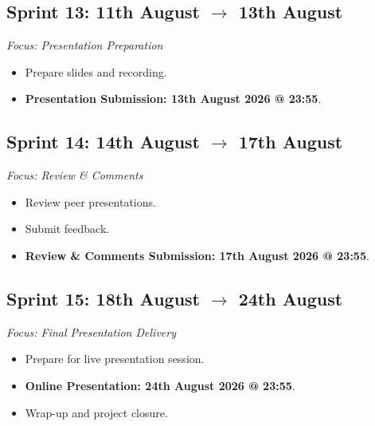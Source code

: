 \documentclass[12pt, a4paper, twoside]{article} %
\begin{document}

\subsection{Sprint 13: 11th August $\rightarrow$ 13th August}
\emph{Focus: Presentation Preparation}

\begin{itemize}
  \item[$\square$] Prepare slides and recording.
  \item[$\square$] \textbf{Presentation Submission: 13th August 2026 @ 23:55}.
\end{itemize}


\subsection{Sprint 14: 14th August $\rightarrow$ 17th August}
\emph{Focus: Review \& Comments}

\begin{itemize}
  \item[$\square$] Review peer presentations.
  \item[$\square$] Submit feedback. \\
  \item[$\square$] \textbf{Review \& Comments Submission: 17th August 2026 @ 23:55}.
\end{itemize}


\subsection{Sprint 15: 18th August $\rightarrow$ 24th August}
\emph{Focus: Final Presentation Delivery}

\begin{itemize}
  \item[$\square$] Prepare for live presentation session.
  \item[$\square$] \textbf{Online Presentation: 24th August 2026 @ 23:55}.  
  \item[$\square$] Wrap-up and project closure.
\end{itemize}
\end{document}
